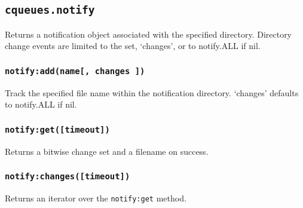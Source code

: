 \documentclass[11pt, oneside]{memoir}
\newcommand*{\fn}[1]{\texttt{#1}\xspace}
\newcommand*{\method}[1]{\texttt{#1}\xspace}
\newcounter{toccols}
\newenvironment{Module}[1]{
	\subsection{\texttt{#1}}
	\addtocontents{toc}{
		\protect\begin{multicols}{\value{toccols}}
	}
}{
	\addtocontents{toc}{\protect\end{multicols}}
}
\begin{document}
\begin{Module}{cqueues.notify}
Returns a notification object associated with the specified directory. Directory change events are limited to the set, `changes', or to notify.ALL if nil.

\subsubsection[\fn{notify:add}]{\fn{notify:add(name[, changes ])}}

Track the specified file name within the notification directory. `changes' defaults to notify.ALL if nil.

\subsubsection[\fn{notify:get}]{\fn{notify:get([timeout])}}

Returns a bitwise change set and a filename on success.

\subsubsection[\fn{notify:changes}]{\fn{notify:changes([timeout])}}

Returns an iterator over the \method{notify:get} method.

\end{Module}
\end{document}
